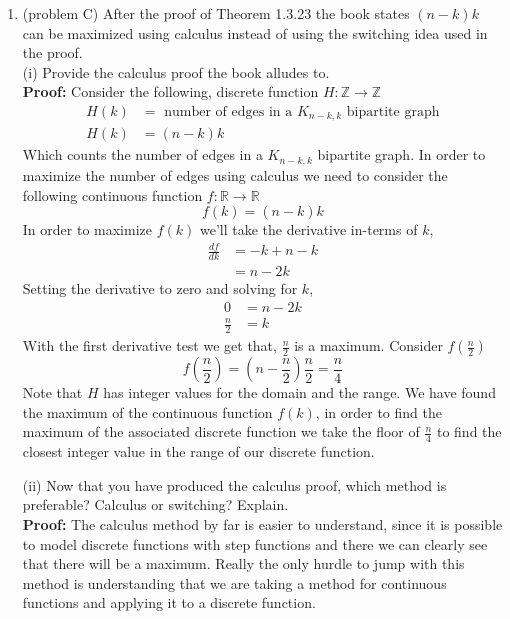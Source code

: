 \documentclass{amsart}
\def\RR{{\mathbb R}}
\def\ZZ{{\mathbb Z}}
\begin{document}
\begin{enumerate}
\vspace{.5in}

\item (problem C) After the proof of Theorem 1.3.23 the book states $(n-k)k$ can be maximized using calculus instead of using the switching idea used in the proof. \\

(i) Provide the calculus proof the book alludes to. \\

\textbf{Proof:} Consider the following, discrete function $H: \ZZ \to \ZZ$
\begin{align*}
H(k) &= \text{ number of edges in a $K_{n-k,k}$ bipartite graph}\\
H(k) &= (n-k) k
\end{align*}
Which counts the number of edges in a $K_{n-k,k}$ bipartite graph. In order to maximize the number of edges using calculus we need to consider the following continuous function $f: \RR \to \RR$ 
\begin{equation*}
f(k) = (n-k)k
\end{equation*}
 In order to maximize $f(k)$ we'll take the derivative in-terms of $k$,
\begin{align*}
\frac{df}{dk} &= -k + n - k\\
&=n - 2k
\end{align*}
Setting the derivative to zero and solving for $k$,
\begin{align*}
 0 &=n - 2k\\
 \frac{n}{2} &= k
\end{align*}
With the first derivative test we get that, $\frac{n}{2}$ is a maximum. Consider $f(\frac{n}{2})$
\begin{equation*}
f(\frac{n}{2}) = (n - \frac{n}{2}) \frac{n}{2} = \frac{n}{4}
\end{equation*}
Note that $H$ has integer values for the domain and the range. We have found the maximum of the continuous function $f(k)$, in order to find the maximum of the associated discrete function we take the floor of $\frac{n}{4}$ to find the closest integer value in the range of our discrete function. 
\vspace{.5in}

(ii) Now that you have produced the calculus proof, which method is preferable? Calculus or switching? Explain.\\


\textbf{Proof:} The calculus method by far is easier to understand, since it is possible to model discrete functions with step functions and there we can clearly see that there will be a maximum. Really the only hurdle to jump with this method is understanding that we are taking a method for continuous functions and applying it to a discrete function. 

\vspace{.5in}


\end{enumerate}
\end{document}
